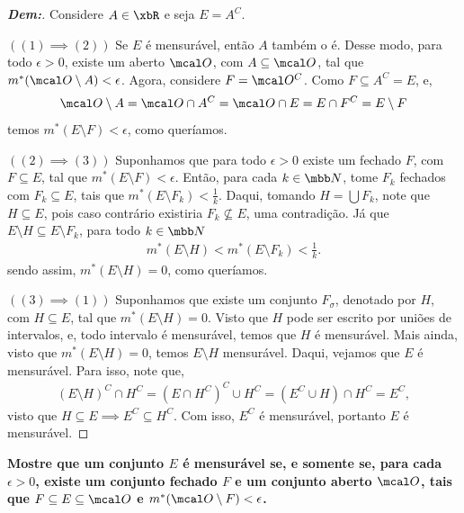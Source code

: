 \bigline
\begin{proof}[\textbf{Dem:}] Considere $A \in \xbR$ e seja $E = A^C$. 

\noindent
  $((1) \implies (2))$ Se $E$ é mensurável, então $A$ também o é. Desse modo, 
  para todo $\epsilon > 0$, existe um aberto $\mcal O$, com $A \subseteq \mcal O$, 
  tal que $m^*(\mcal O \setminus A) < \epsilon$. Agora, considere $F = \mcal O^C$. 
  Como $F \subseteq A^C = E$, e, 
  \begin{align*}
    \mcal O \setminus A = \mcal O \cap A^C = \mcal O \cap E = E\cap F^C = E\setminus F
  \end{align*}
  temos $m^*(E\setminus F) < \epsilon$, como queríamos.

  \noindent
  $((2) \implies (3))$ Suponhamos que para todo $\epsilon > 0$ existe um fechado $F$,
  com $F \subseteq E$, tal que $m^*(E\setminus F) < \epsilon$. Então, para cada $k \in \mbb N$,
  tome $F_k$ fechados com $F_k \subseteq E$, tais que $m^*(E\setminus F_k)< 
  \frac{1}{k}$. Daqui, tomando $H = \bigcup F_k$, note que $H \subseteq E$, pois caso contrário
  existiria $F_k \not \subseteq E$, uma contradição. Já que $E\setminus H 
  \subseteq E\setminus F_k$, para todo $k \in \mbb N$
  \begin{align*}
    m^*(E\setminus H) < m^*(E\setminus F_k) < \frac{1}{k}. 
  \end{align*}
  sendo assim, $m^*(E\setminus H) = 0$, como queríamos.
  
  \noindent
  $((3) \implies (1))$ Suponhamos que existe um conjunto $F_\sigma$, denotado 
  por $H$, com $H \subseteq E$, tal que $m^*(E\setminus H) = 0$. Visto que $H$ pode 
  ser escrito por uniões de intervalos, e, todo intervalo é mensurável, temos 
  que $H$ é mensurável. Mais ainda, visto que $m^*(E \setminus H) = 0$, 
  temos $E\setminus H$ mensurável. Daqui, vejamos que $E$ é mensurável. Para isso, 
  note que, 
  \begin{align*}
    (E\setminus H)^C\cap H^C = (E \cap H^C)^C \cup H^C = (E^C \cup H) \cap H^C
    = E^C,
  \end{align*}
  visto que $H\subseteq E \implies E^C \subseteq H^C$. Com isso, $E^C$ é mensurável,
  portanto $E$ é mensurável.
\end{proof}
\biglinend
\newpage
{}
\bigline 
\textbf{Mostre que um conjunto $E$ é mensurável se, e somente se, para cada $\epsilon > 0$, 
existe um conjunto fechado $F$ e um conjunto aberto $\mcal O$, tais que 
$F \subseteq E \subseteq \mcal O$ e $m^*(\mcal O\setminus F) < \epsilon$.}
